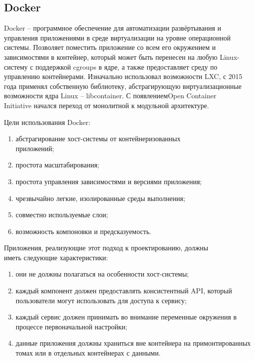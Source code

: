 \subsection{Docker}
\label{sec:development:docker}

Docker -- программное обеспечение для автоматизации развёртывания и управления приложениями в среде виртуализации на уровне операционной системы. Позволяет поместить приложение со всем его окружением и зависимостями в контейнер, который может быть перенесен на любую Linux-систему с поддержкой cgroups в ядре, а также предоставляет среду по управлению контейнерами. Изначально использовал возможности LXC, с 2015 года применял собственную библиотеку, абстрагирующую виртуализационные возможности ядра Linux -- libcontainer. С появлением ​Open Container \\Initiative начался переход от монолитной к модульной архитектуре.

Цели использования Docker:
\begin{enumerate}
  \item абстрагирование хост-системы от контейнеризованных \\при\-ло\-же\-ний;
  \item простота масштабирования;
  \item простота управления зависимостями и версиями приложения;
  \item чрезвычайно легкие, изолированные среды выполнения;
  \item совместно используемые слои;
  \item возможность компоновки и предсказуемость.
\end{enumerate}

Приложения, реализующие этот подход к проектированию, должны \\иметь следующие характеристики:
\begin{enumerate}
  \item они не должны полагаться на особенности хост-системы;
  \item каждый компонент должен предоставлять консистентный API, который пользователи могут использовать для доступа к сервису;
  \item каждый сервис должен принимать во внимание переменные окружения в процессе первоначальной настройки;
  \item данные приложения должны храниться вне контейнера на примонтированных томах или в отдельных контейнерах с данными.
\end{enumerate}
